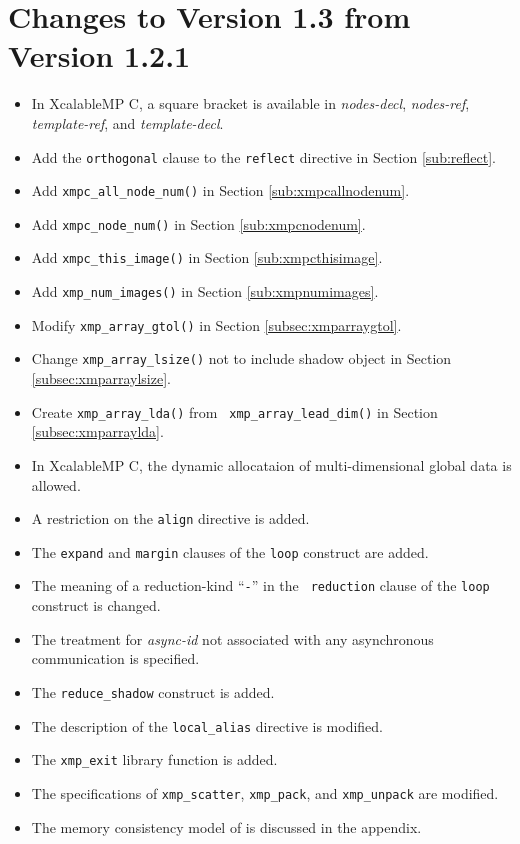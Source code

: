 \section{Changes to Version 1.3 from Version 1.2.1}
\begin{itemize}
  \item In XcalableMP C, a square bracket is available in {\it nodes-decl}, {\it nodes-ref}, 
  {\it template-ref}, and {\it template-decl}.
  \item Add the {\tt orthogonal} clause to the {\tt reflect} directive in Section \ref{sub:reflect}.
  \item Add {\tt xmpc\_all\_node\_num()} in Section \ref{sub:xmpcallnodenum}.
  \item Add {\tt xmpc\_node\_num()} in Section \ref{sub:xmpcnodenum}.
  \item Add {\tt xmpc\_this\_image()} in Section \ref{sub:xmpcthisimage}.
  \item Add {\tt xmp\_num\_images()} in Section \ref{sub:xmpnumimages}.
  \item Modify {\tt xmp\_array\_gtol()} in Section \ref{subsec:xmparraygtol}.
  \item Change {\tt xmp\_array\_lsize()} not to include shadow object in Section \ref{subsec:xmparraylsize}.
  \item Create {\tt xmp\_array\_lda()} from {\tt
		xmp\_array\_lead\_dim()} in Section \ref{subsec:xmparraylda}.

  \item In XcalableMP C, the dynamic allocataion of multi-dimensional global
		data is allowed.
  \item A restriction on the {\tt align} directive is added.
  \item The {\tt expand} and {\tt margin} clauses of the {\tt loop}
		construct are added.
  \item The meaning of a reduction-kind ``{\tt -}'' in the {\tt
		reduction} clause of the {\tt loop} construct is changed.
  \item The treatment for {\it async-id} not associated with any asynchronous
		communication is specified.
  \item The {\tt reduce\_shadow} construct is added.
  \item The description of the {\tt local\_alias} directive is modified.
  \item The {\tt xmp\_exit} library function is added.
  \item The specifications of {\tt xmp\_scatter}, {\tt xmp\_pack}, and
		{\tt xmp\_unpack} are modified.
  \item The memory consistency model of {\XMP} is discussed in the appendix.
\end{itemize}

